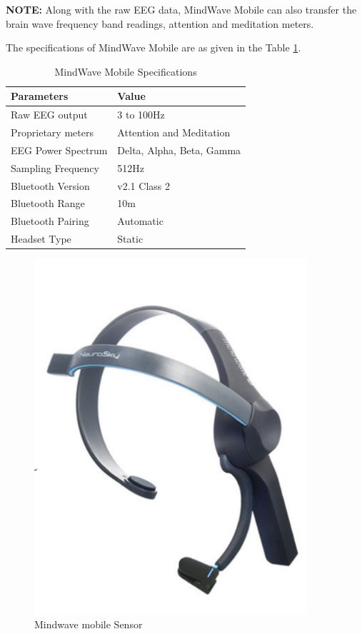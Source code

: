             \textbf{NOTE:} Along with the raw EEG data, MindWave Mobile can also transfer the brain wave frequency band readings, attention and meditation meters.
            
            The specifications of MindWave Mobile are as given in the Table \ref{specs}.
        \begin{table}[h!]
          \centering
          \caption{MindWave Mobile Specifications}
          \label{specs}
          \begin{tabular}{l l}
            \hline
            Parameters &Value\\\hline
            Raw EEG output & 3 to 100Hz\\
            Proprietary meters & Attention and Meditation\\
            EEG Power Spectrum & Delta, Alpha, Beta, Gamma\\
            Sampling Frequency & 512Hz\\
            Bluetooth Version&v2.1 Class 2\\
            Bluetooth Range &10m\\
            Bluetooth Pairing &Automatic\\
            Headset Type& Static\\
          \end{tabular}
        \end{table}
        
        \begin{figure}[hbtp]
            \centering
            \includegraphics[width=0.9\textwidth]{Chapter-2/mindwavemobile}
            \caption{Mindwave mobile Sensor }
            \label{fig:mindwavemobile}
        \end{figure}
    
